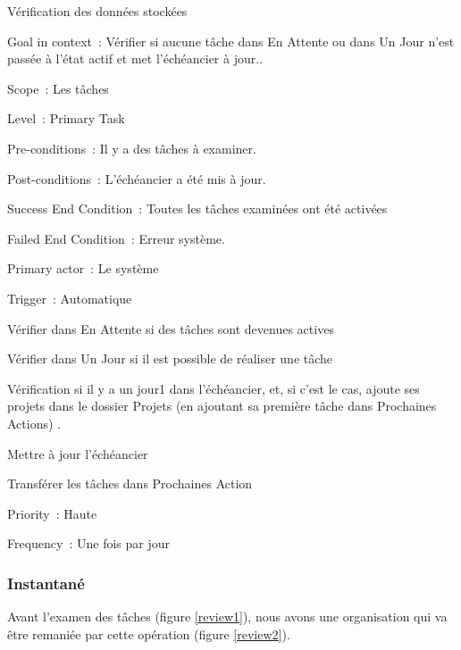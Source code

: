 \begin{usecase}{Vérification des données stockées}
\begin{information}
\item[Goal in context~:] Vérifier si aucune tâche dans En Attente ou dans Un Jour n'est passée à l'état actif  et met l'échéancier à jour..
\item[Scope~:] Les tâches
\item[Level~:] Primary Task
\item[Pre-conditions~:] Il y a des tâches à examiner.
\item[Post-conditions~:] L'échéancier a été mis à jour.
\item[Success End Condition~:] Toutes les tâches examinées ont été activées
\item[Failed End Condition~:] Erreur système.
\item[Primary actor~:] Le système
\item[Trigger~:] Automatique
\\
\end{information}
\begin{scenario}
\item Vérifier dans En Attente si des tâches sont devenues actives
\item Vérifier dans Un Jour si il est possible de réaliser une tâche
\item Vérification si il y a un jour1 dans l'échéancier, et, si c'est le cas, ajoute ses projets dans le dossier Projets (en ajoutant sa première tâche dans Prochaines Actions) .
\item Mettre à jour l'échéancier
\item Transférer les tâches dans Prochaines Action
\\
\end{scenario}
\begin{relatedinformation}
\item[Priority~:] Haute
\item[Frequency~:] Une fois par jour
\\
\end{relatedinformation}
\end{usecase}

\subsubsection{Instantané}

Avant l'examen des tâches (figure \ref{review1}), nous avons une organisation qui va être remaniée par cette opération (figure \ref{review2}).

